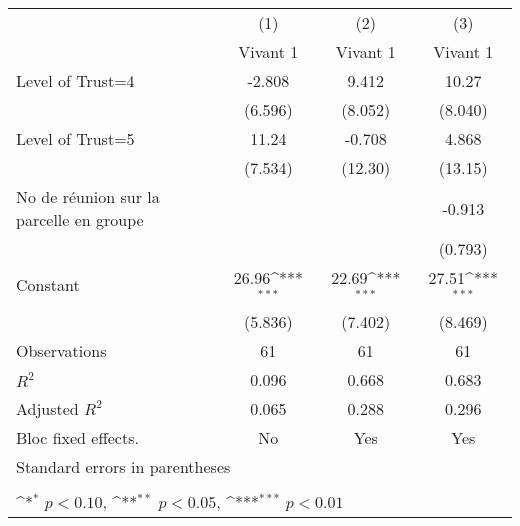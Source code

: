 {
\def\sym#1{\ifmmode^{#1}\else\(^{#1}\)\fi}
\begin{tabular}{l*{3}{c}}
\hline\hline
                    &\multicolumn{1}{c}{(1)}&\multicolumn{1}{c}{(2)}&\multicolumn{1}{c}{(3)}\\
                    &\multicolumn{1}{c}{Vivant 1}&\multicolumn{1}{c}{Vivant 1}&\multicolumn{1}{c}{Vivant 1}\\
\hline
Level of Trust=4    &      -2.808         &       9.412         &       10.27         \\
                    &     (6.596)         &     (8.052)         &     (8.040)         \\
[1em]
Level of Trust=5    &       11.24         &      -0.708         &       4.868         \\
                    &     (7.534)         &     (12.30)         &     (13.15)         \\
[1em]
No de réunion sur la parcelle en groupe&                     &                     &      -0.913         \\
                    &                     &                     &     (0.793)         \\
[1em]
Constant            &       26.96\sym{***}&       22.69\sym{***}&       27.51\sym{***}\\
                    &     (5.836)         &     (7.402)         &     (8.469)         \\
\hline
Observations        &          61         &          61         &          61         \\
\(R^{2}\)           &       0.096         &       0.668         &       0.683         \\
Adjusted \(R^{2}\)  &       0.065         &       0.288         &       0.296         \\
Bloc fixed effects. &          No         &         Yes         &         Yes         \\
\hline\hline
\multicolumn{4}{l}{\footnotesize Standard errors in parentheses}\\
\multicolumn{4}{l}{\footnotesize }\\
\multicolumn{4}{l}{\footnotesize \sym{*} \(p<0.10\), \sym{**} \(p<0.05\), \sym{***} \(p<0.01\)}\\
\end{tabular}
}
